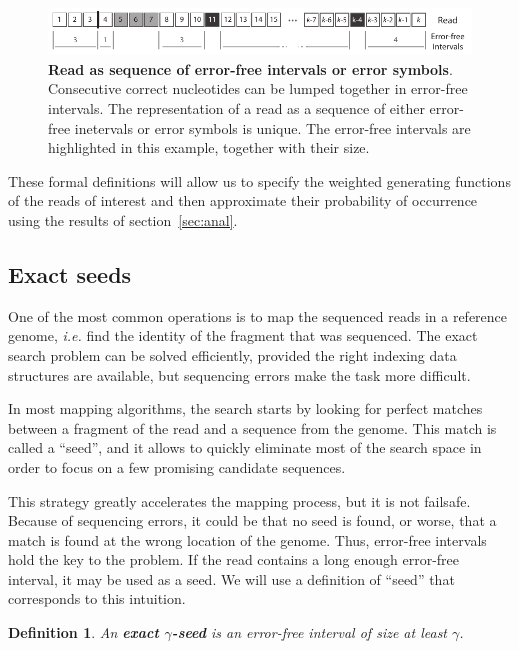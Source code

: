 \documentclass{article}
\newtheorem{definition}{Definition}
\begin{document}
\begin{figure}[h]
\centering
\includegraphics[scale=0.88]{sketch_seeding_error_free_intervals.pdf}
\caption{\textbf{Read as sequence of error-free intervals or error
symbols}. Consecutive correct nucleotides can be lumped together in
error-free intervals. The representation of a read as a sequence of either
error-free inetervals or error symbols is unique. The error-free intervals
are highlighted in this example, together with their size.}
\label{fig:sketchseed_interval}
\end{figure}

These formal definitions will allow us to specify the weighted generating
functions of the reads of interest and then approximate their probability
of occurrence using the results of section~\ref{sec:anal}.


\subsection{Exact seeds}

One of the most common operations is to map the sequenced reads in a
reference genome, \textit{i.e.} find the identity of the fragment that was
sequenced. The exact search problem can be solved efficiently, provided
the right indexing data structures are available, but sequencing errors
make the task more difficult. 

In most mapping algorithms, the search starts by looking for perfect
matches between a fragment of the read and a sequence from the genome.
This match is called a ``seed'', and it allows to quickly eliminate most
of the search space in order to focus on a few promising candidate
sequences.

This strategy greatly accelerates the mapping process, but it is not
failsafe. Because of sequencing errors, it could be that no seed is found,
or worse, that a match is found at the wrong location of the genome. Thus,
error-free intervals hold the key to the problem. If the read contains a
long enough error-free interval, it may be used as a seed. We will
use a definition of ``seed'' that corresponds to this intuition.

\begin{definition}
\label{def:seed}
An \textbf{exact $\gamma$-seed} is an error-free interval of size at least
$\gamma$.
\end{definition}
\end{document}
